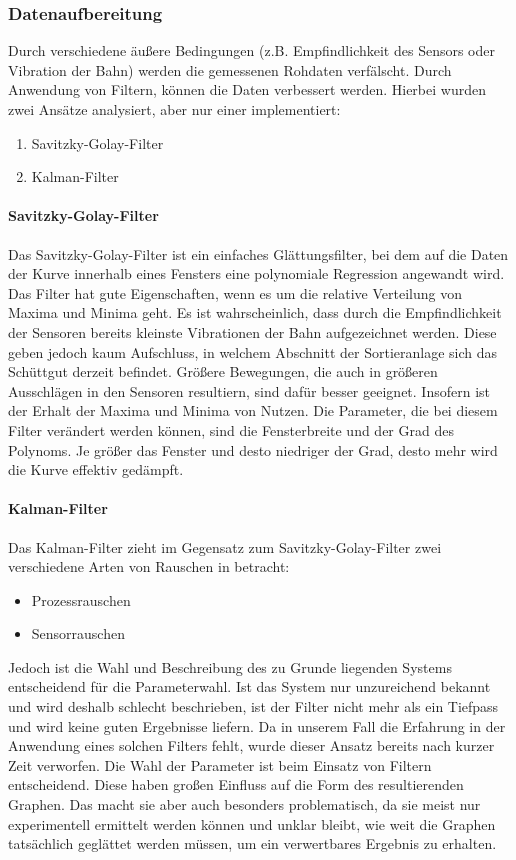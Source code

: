 \subsubsection{Datenaufbereitung}
Durch verschiedene äußere Bedingungen (z.B. Empfindlichkeit des Sensors oder Vibration der Bahn) werden die gemessenen Rohdaten verfälscht. Durch Anwendung von Filtern, können die Daten verbessert werden.
Hierbei wurden zwei Ansätze analysiert, aber nur einer implementiert:
\begin{enumerate}
\item Savitzky-Golay-Filter
\item Kalman-Filter
\end{enumerate}
\paragraph{Savitzky-Golay-Filter}
Das Savitzky-Golay-Filter ist ein einfaches Glättungsfilter, bei dem auf die Daten der Kurve innerhalb eines Fensters eine polynomiale Regression angewandt wird. Das Filter hat gute Eigenschaften, wenn es um die relative Verteilung von Maxima und Minima geht. Es ist wahrscheinlich, dass durch die Empfindlichkeit der Sensoren bereits kleinste Vibrationen der Bahn aufgezeichnet werden. Diese geben jedoch kaum Aufschluss, in welchem Abschnitt der Sortieranlage sich das Schüttgut derzeit befindet. Größere Bewegungen, die auch in größeren Ausschlägen in den Sensoren resultiern, sind dafür besser geeignet. Insofern ist der Erhalt der Maxima und Minima von Nutzen.
Die Parameter, die bei diesem Filter verändert werden können, sind die Fensterbreite und der Grad des Polynoms. Je größer das Fenster und desto niedriger der Grad, desto mehr wird die Kurve effektiv gedämpft.
\paragraph{Kalman-Filter}
Das Kalman-Filter zieht im Gegensatz zum Savitzky-Golay-Filter zwei verschiedene Arten von Rauschen in betracht:
\begin{itemize}
\item Prozessrauschen 
\item Sensorrauschen
\end{itemize}
Jedoch ist die Wahl und Beschreibung des zu Grunde liegenden Systems entscheidend für die Parameterwahl. Ist das System nur unzureichend bekannt und wird deshalb schlecht beschrieben, ist der Filter nicht mehr als ein Tiefpass und wird keine guten Ergebnisse liefern. Da in unserem Fall die Erfahrung in der Anwendung eines solchen Filters fehlt, wurde dieser Ansatz bereits nach kurzer Zeit verworfen.
Die Wahl der Parameter ist beim Einsatz von Filtern entscheidend. Diese haben großen Einfluss auf die Form des resultierenden Graphen. Das macht sie aber auch besonders problematisch, da sie meist nur experimentell ermittelt werden können und unklar bleibt, wie weit die Graphen tatsächlich geglättet werden müssen, um ein verwertbares Ergebnis zu erhalten. 